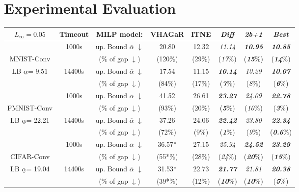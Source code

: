 \section{Experimental Evaluation}



\begin{table}[b!]
	\centering
	\begin{tabular}{||c c||c c c c c ||c|}\hline
	$L_\infty=0.05$ & Timeout & MILP model: & VHAGaR &  ITNE & {\em Diff} & {\em 2b+1} & {\em Best} \\\hline \hline
	  & 1000s & up. Bound $\overline{\alpha}$ $\downarrow$ &  20.80 & 12.32 & {\em 11.14} & {\em \bf 10.95} & {\bf \em 10.85}
    \\
	MNIST-Conv & & ($\%$ of gap $\downarrow$) & (120$\%$) & (29$\%$) & ({\em 17}$\%$) & ({\em \bf 15}$\%$) & ({\bf \em 14}$\%$)
	\\
	 LB $\underline{\alpha}$= 9.51 & 14400s & up. Bound $\overline{\alpha}$ $\downarrow$ & 17.54 & 11.15 & {\bf \em 10.14} & {\em 10.29} & {\bf \em 10.07}
    \\
	  & & ($\%$ of gap $\downarrow$) &  (84$\%$) & (17$\%$) & ({\bf \em 7}$\%$) & ({\em 8}$\%$) & ({\bf \em 6}$\%$) 
    \\\hline

	
	& 1000s & up. Bound $\overline{\alpha}$ $\downarrow$ & 41.52 & 26.61 & {\bf \em 23.27}  & {\em 24.09} & {\bf \em 22.78}
    \\
	FMNIST-Conv & & ($\%$ of gap $\downarrow$) & (93$\%$) & (20$\%$) & ({\bf \em 5}$\%$) & ({\em 10}$\%$) & ({\bf \em 3}$\%$)
    \\


	LB $\underline{\alpha}$= 22.21 & 14400s & up. Bound $\overline{\alpha}$ $\downarrow$ & 37.26 & 24.06 & {\bf \em 22.42 } & {\em  23.80} & {\bf \em 22.34}
    \\
	 & & ($\%$ of gap $\downarrow$) & (72$\%$) &  (9$\%$) & ({\bf \em 1}$\%$) & ({\em 9}$\%$) & ({\bf \em 0.6}$\%$)
    \\\hline
	

	& 1000s  & up. Bound $\overline{\alpha}$ $\downarrow$ & 36.57* & 27.15 & 
	{\em 25.94} & {\bf \em 24.52}& {\bf \em 23.29}
    \\
	CIFAR-Conv & & ($\%$ of gap $\downarrow$) & (55*$\%$) & (28$\%$) & ({\em 24}$\%$) & ({\bf \em 20}$\%$) & ({\bf \em 15}$\%$)
	\\
    
	LB $\underline{\alpha}$= 19.04 & 14400s  & up. Bound $\overline{\alpha}$ $\downarrow$ & 31.53* & 22.73 & {\bf \em 21.77} & {\em 21.81} & {\bf \em 20.38}
    \\
	 & & ($\%$ of gap $\downarrow$) & (39*$\%$) & (12$\%$) & ({\bf \em 10}$\%$) & ({\bf \em 10}$\%$) & ({\bf \em 5}$\%$)
		\\\hline
    

\end{tabular}
\end{table}
